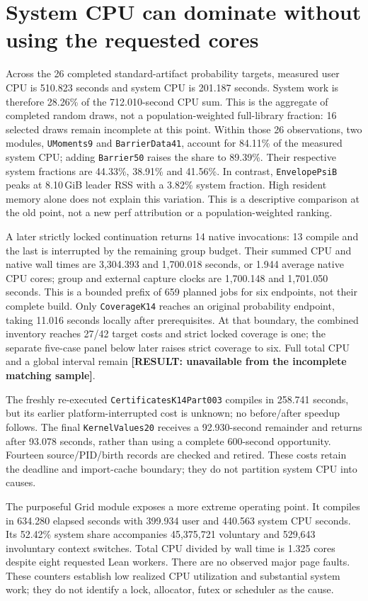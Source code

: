 \documentclass[10pt,twocolumn]{article}
\newcommand{\missing}[1]{\textbf{[RESULT: #1]}}
\begin{document}
\section{System CPU can dominate without using the requested cores}
\label{sec:system}
Across the 26 completed standard-artifact probability targets, measured
user CPU is 510.823 seconds and system CPU is 201.187 seconds.
System work is therefore 28.26\% of the 712.010-second CPU sum.
This is the aggregate of completed random draws, not a population-weighted
full-library fraction: 16 selected draws remain incomplete at this point.
Within those 26 observations, two modules, \texttt{UMoments9} and
\texttt{BarrierData41}, account for 84.11\% of the measured system CPU;
adding \texttt{Barrier50} raises the share to 89.39\%.
Their respective system fractions are 44.33\%, 38.91\% and 41.56\%.
In contrast, \texttt{EnvelopePsiB} peaks at 8.10\,GiB leader RSS with a
3.82\% system fraction. High resident memory alone does not explain
this variation. This is a descriptive comparison at the old point, not a
new perf attribution or a population-weighted ranking.

A later strictly locked continuation returns 14 native invocations:
13 compile and the last is interrupted by the remaining group budget.
Their summed CPU and native wall times are 3,304.393 and 1,700.018 seconds,
or 1.944 average native CPU cores; group and external capture clocks are
1,700.148 and 1,701.050 seconds. This is a bounded prefix of 659 planned
jobs for six endpoints, not their complete build.
Only \texttt{CoverageK14} reaches an original probability endpoint,
taking 11.016 seconds locally after prerequisites.
At that boundary, the combined inventory reaches 27/42 target costs
and strict locked coverage is one; the separate five-case panel below
later raises strict coverage to six. Full total CPU and a global interval remain
\missing{unavailable from the incomplete matching sample}.

The freshly re-executed \texttt{CertificatesK14Part003} compiles in
258.741 seconds, but its earlier platform-interrupted cost is unknown;
no before/after speedup follows.
The final \texttt{KernelValues20} receives a 92.930-second remainder and
returns after 93.078 seconds, rather than using a complete 600-second
opportunity. Fourteen source/PID/birth records are checked and retired.
These costs retain the deadline and import-cache boundary; they do not
partition system CPU into causes.

The purposeful Grid module exposes a more extreme operating point.
It compiles in 634.280 elapsed seconds with 399.934 user and 440.563
system CPU seconds. Its 52.42\% system share accompanies 45,375,721
voluntary and 529,643 involuntary context switches.
Total CPU divided by wall time is 1.325 cores despite eight requested Lean
workers. There are no observed major page faults.
These counters establish low realized CPU utilization and substantial
system work; they do not identify a lock, allocator, futex or scheduler
as the cause.
\end{document}
